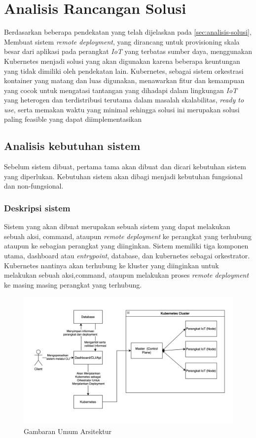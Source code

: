 \section{Analisis Rancangan Solusi}
\label{sec:analisis-rancangan-solusi}

Berdasarkan beberapa pendekatan yang telah dijelaskan pada \ref{sec:analisis-solusi}, Membuat sistem \textit{remote deployment}, yang dirancang untuk provisioning skala besar dari aplikasi pada perangkat \textit{IoT} yang terbatas sumber daya, menggunakan Kubernetes menjadi solusi yang akan digunakan karena beberapa keuntungan yang tidak dimiliki oleh pendekatan lain. Kubernetes, sebagai sistem orkestrasi kontainer yang matang dan luas digunakan, menawarkan fitur dan kemampuan yang cocok untuk mengatasi tantangan yang dihadapi dalam lingkungan \textit{IoT} yang heterogen dan terdistribusi terutama dalam masalah skalabilitas, \textit{ready to use}, serta memakan waktu yang minimal sehingga solusi ini merupakan solusi paling feasible yang dapat diimplementasikan

\subsection{Analisis kebutuhan sistem}

Sebelum sistem dibuat, pertama tama akan dibuat dan dicari kebutuhan sistem yang diperlukan. Kebutuhan sistem akan dibagi menjadi kebutuhan fungsional dan non-fungsional.

\subsubsection{Deskripsi sistem}
Sistem yang akan dibuat merupakan sebuah sistem yang dapat melakukan sebuah aksi, command, ataupun \textit{remote deployment} ke perangkat yang terhubung ataupun ke sebagian perangkat yang diinginkan. Sistem memiliki tiga komponen utama, dashboard atau \textit{entrypoint}, database, dan kubernetes sebagai orkestrator. Kubernetes nantinya akan terhubung ke kluster yang diinginkan untuk melakukan sebuah aksi,command, ataupun melakukan proses \textit{remote deployment} ke masing masing perangkat yang terhubung.

\begin{figure}[h]
  \centering
  \includegraphics[width=1\textwidth]{resources/chapter-3/gambaran-umum-arsitektur-updated.jpg}
  \caption{Gambaran Umum Arsitektur}
  \label{fig:gambaran-umum-arsitektur}
\end{figure}

